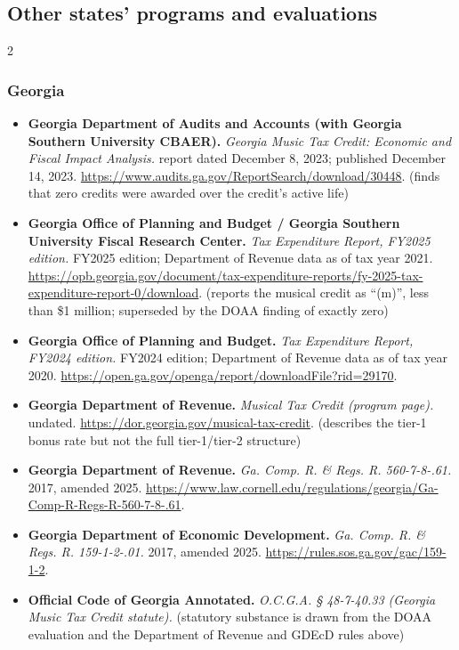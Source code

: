 \subsection*{Other states' programs and evaluations}
{\scriptsize\renewcommand{\baselinestretch}{0.88}\selectfont\raggedright
\begin{multicols}{2}
\setlength{\parskip}{0pt}
\subsubsection*{Georgia}
\begin{itemize}[itemsep=0pt,topsep=1pt,parsep=0pt,partopsep=0pt,leftmargin=1em]
\item \textbf{Georgia Department of Audits and Accounts (with Georgia Southern University CBAER).} \textit{Georgia Music Tax Credit: Economic and Fiscal Impact Analysis.} report dated December 8, 2023; published December 14, 2023. \url{https://www.audits.ga.gov/ReportSearch/download/30448}. {\color{ammuted}(finds that zero credits were awarded over the credit’s active life)}
\item \textbf{Georgia Office of Planning and Budget / Georgia Southern University Fiscal Research Center.} \textit{Tax Expenditure Report, FY2025 edition.} FY2025 edition; Department of Revenue data as of tax year 2021. \url{https://opb.georgia.gov/document/tax-expenditure-reports/fy-2025-tax-expenditure-report-0/download}. {\color{ammuted}(reports the musical credit as “(m)”, less than \$1 million; superseded by the DOAA finding of exactly zero)}
\item \textbf{Georgia Office of Planning and Budget.} \textit{Tax Expenditure Report, FY2024 edition.} FY2024 edition; Department of Revenue data as of tax year 2020. \url{https://open.ga.gov/openga/report/downloadFile?rid=29170}.
\item \textbf{Georgia Department of Revenue.} \textit{Musical Tax Credit (program page).} undated. \url{https://dor.georgia.gov/musical-tax-credit}. {\color{ammuted}(describes the tier-1 bonus rate but not the full tier-1/tier-2 structure)}
\item \textbf{Georgia Department of Revenue.} \textit{Ga. Comp. R. \& Regs. R. 560-7-8-.61.} 2017, amended 2025. \url{https://www.law.cornell.edu/regulations/georgia/Ga-Comp-R-Regs-R-560-7-8-.61}.
\item \textbf{Georgia Department of Economic Development.} \textit{Ga. Comp. R. \& Regs. R. 159-1-2-.01.} 2017, amended 2025. \url{https://rules.sos.ga.gov/gac/159-1-2}.
\item \textbf{Official Code of Georgia Annotated.} \textit{O.C.G.A. § 48-7-40.33 (Georgia Music Tax Credit statute).} {\color{ammuted}(statutory substance is drawn from the DOAA evaluation and the Department of Revenue and GDEcD rules above)}
\end{itemize}

\end{multicols}}
